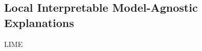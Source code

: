\subsection{Local Interpretable Model-Agnostic Explanations}
\label{chp:fundamentals:sec:machine_learning:subsec:transfer_learning}
\Ac{LIME}
